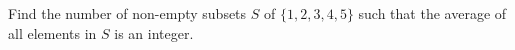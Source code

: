 Find the number of non-empty subsets $S$ of $\{1, 2, 3, 4, 5\}$ such that the average of all elements in $S$ is an integer.
